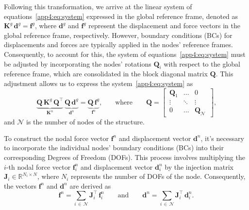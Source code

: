 Following this transformation, we arrive at the linear system of equations~\eqref{app4:eq:system} expressed in the global reference frame, denoted as $\mathbf{K}^{g} \, \mathbf{d}^{g} = \mathbf{f}^{g}$, where $\mathbf{d}^{g}$ and $\mathbf{f}^{g}$ represent the displacement and force vectors in the global reference frame, respectively. However, boundary conditions (\acp{BC}) for displacements and forces are typically applied in the nodes' reference frames. Consequently, to account for this, the system of equations~\eqref{app4:eq:system} must be adjusted by incorporating the nodes' rotations $\mathbf{Q}_{i}$ with respect to the global reference frame, which are consolidated in the block diagonal matrix $\mathbf{Q}$. This adjustment allows us to express the system~\eqref{app4:eq:system} as
%
\begin{equation}
  \underbrace{\mathbf{Q} \, \mathbf{K}^{g} \, \mathbf{Q}^\top}_{\displaystyle\mathbf{K}^{n}} \, \underbrace{\mathbf{Q} \, \mathbf{d}^{g}}_{\displaystyle\mathbf{d}^{n}} = \underbrace{\mathbf{Q} \, \mathbf{f}^{g}}_{\displaystyle\mathbf{f}^{n}} \text{,} \qquad \text{where} \qquad \mathbf{Q} = \left[\,\begin{matrix}
    \mathbf{Q}_{1} & \ldots & 0 \\[0.25em]
    \vdots       & \ddots & \vdots \\[0.25em]
    0            & \ldots & \mathbf{Q}_{\mathcal{N}}
  \end{matrix}\,\right] \text{,}
\end{equation}
%
and $\mathcal{N}$ is the number of nodes of the structure.

To construct the nodal force vector $\mathbf{f}^{n}$ and displacement vector $\mathbf{d}^{n}$, it's necessary to incorporate the individual nodes' boundary conditions (\acp{BC}) into their corresponding Degrees of Freedom (\acp{DOF}). This process involves multiplying the $i$-th nodal force vector $\mathbf{f}^{n}_{i}$ and displacement vector $\mathbf{d}^{n}_{i}$ by the injection matrix $\mathbf{J}_{i} \in \mathbb{R}^{N_i \times N}$, where $N_i$ represents the number of \acp{DOF} of the node. Consequently, the vectors $\mathbf{f}^{n}$ and $\mathbf{d}^{n}$ are derived as
%
\begin{equation}
  \mathbf{f}^{n} = \sum_{i \, \in \, \mathcal{N}} \mathbf{J}_{i}^\top \, \mathbf{f}^{n}_{i}
  \qquad \text{and} \qquad
  \mathbf{d}^{n} = \sum_{i \, \in \, \mathcal{N}} \mathbf{J}_{i}^\top \, \mathbf{d}^{n}_{i} \text{.}
\end{equation}

